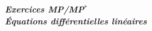 \documentclass[12pt]{article}
\begin{document}
\begin{titlepage}
	\centering
	\vspace*{\fill}
	\Huge \textit{\textbf{Exercices MP/MP$^*$\\ Équations différentielles linéaires}}
	\vspace*{\fill}
\end{titlepage}
\end{document}

